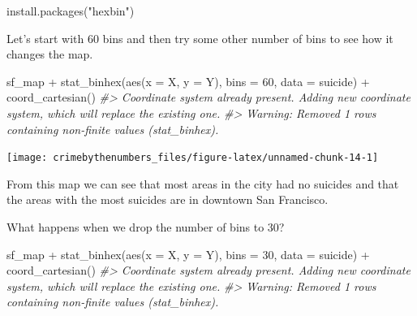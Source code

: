 \documentclass[
]{krantz}
\makeatletter
\newenvironment{Shaded}{\begin{snugshade}}{\end{snugshade}}
\newcommand{\AttributeTok}[1]{\textcolor[rgb]{0.61,0.61,0.61}{#1}}
\newcommand{\CommentTok}[1]{\textcolor[rgb]{0.37,0.37,0.37}{\textit{#1}}}
\newcommand{\DecValTok}[1]{\textcolor[rgb]{0.06,0.06,0.06}{#1}}
\newcommand{\FunctionTok}[1]{\textcolor[rgb]{0,0,0}{#1}}
\newcommand{\NormalTok}[1]{#1}
\newcommand{\SpecialCharTok}[1]{\textcolor[rgb]{0,0,0}{#1}}
\newcommand{\StringTok}[1]{\textcolor[rgb]{0.5,0.5,0.5}{#1}}
\newenvironment{kframe}{%
\medskip{}
\setlength{\fboxsep}{.8em}
 \def\at@end@of@kframe{}%
 \ifinner\ifhmode%
  \def\at@end@of@kframe{\end{minipage}}%
  \begin{minipage}{\columnwidth}%
 \fi\fi%
 \def\FrameCommand##1{\hskip\@totalleftmargin \hskip-\fboxsep
 \colorbox{shadecolor}{##1}\hskip-\fboxsep
     \hskip-\linewidth \hskip-\@totalleftmargin \hskip\columnwidth}%
 \MakeFramed {\advance\hsize-\width
   \@totalleftmargin\z@ \linewidth\hsize
   \@setminipage}}%
 {\par\unskip\endMakeFramed%
 \at@end@of@kframe}
\renewenvironment{Shaded}{\begin{kframe}}{\end{kframe}}
\makeatother
\begin{document}
\begin{Shaded}
\begin{Highlighting}[]
\FunctionTok{install.packages}\NormalTok{(}\StringTok{"hexbin"}\NormalTok{)}
\end{Highlighting}
\end{Shaded}

Let's start with 60 bins and then try some other number of bins to see how it changes the map.

\begin{Shaded}
\begin{Highlighting}[]
\NormalTok{sf\_map }\SpecialCharTok{+}
  \FunctionTok{stat\_binhex}\NormalTok{(}\FunctionTok{aes}\NormalTok{(}\AttributeTok{x =}\NormalTok{ X, }\AttributeTok{y =}\NormalTok{ Y),}
              \AttributeTok{bins =} \DecValTok{60}\NormalTok{,}
              \AttributeTok{data =}\NormalTok{ suicide) }\SpecialCharTok{+}
  \FunctionTok{coord\_cartesian}\NormalTok{() }
\CommentTok{\#\textgreater{} Coordinate system already present. Adding new coordinate system, which will replace the existing one.}
\CommentTok{\#\textgreater{} Warning: Removed 1 rows containing non{-}finite values (stat\_binhex).}
\end{Highlighting}
\end{Shaded}

\begin{center}\texttt{[image: crimebythenumbers\_files/figure-latex/unnamed-chunk-14-1]} \end{center}

From this map we can see that most areas in the city had no suicides and that the areas with the most suicides are in downtown San Francisco.

What happens when we drop the number of bins to 30?

\begin{Shaded}
\begin{Highlighting}[]
\NormalTok{sf\_map }\SpecialCharTok{+}
  \FunctionTok{stat\_binhex}\NormalTok{(}\FunctionTok{aes}\NormalTok{(}\AttributeTok{x =}\NormalTok{ X, }\AttributeTok{y =}\NormalTok{ Y),}
              \AttributeTok{bins =} \DecValTok{30}\NormalTok{,}
              \AttributeTok{data =}\NormalTok{ suicide) }\SpecialCharTok{+}
  \FunctionTok{coord\_cartesian}\NormalTok{() }
\CommentTok{\#\textgreater{} Coordinate system already present. Adding new coordinate system, which will replace the existing one.}
\CommentTok{\#\textgreater{} Warning: Removed 1 rows containing non{-}finite values (stat\_binhex).}
\end{Highlighting}
\end{Shaded}
\end{document}
